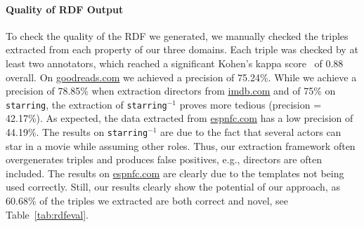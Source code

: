 \paragraph{Quality of RDF Output}
To check the quality of the \ac{RDF} we generated, we manually checked the triples extracted from each property of our three domains.
Each triple was checked by at least two annotators, which reached a significant Kohen's kappa score~\cite{cohen1960coefficient} of 0.88 overall.
On \url{goodreads.com} we achieved a precision of 75.24\%.
While we achieve a precision of 78.85\% when extraction directors from \url{imdb.com} and of 75\% on \texttt{starring}, the extraction of \texttt{starring}$^{-1}$ proves more tedious (precision = 42.17\%).
As expected, the data extracted from \url{espnfc.com} has a low precision of 44.19\%.
The results on \texttt{starring}$^{-1}$ are due to the fact that several actors can star in a movie while assuming other roles. 
Thus, our extraction framework often overgenerates triples and produces false positives, e.g., directors are often included.
The results on \url{espnfc.com} are clearly due to the templates not being used correctly.
Still, our results clearly show the potential of our approach, as 60.68\% of the triples we extracted are both correct and novel, see Table~\ref{tab:rdfeval}.


\begin{table}[htb!]
\centering
{}
\caption{Triples generated by 100 randomly sampled pages, number of possible triples generated by using gold standard rules}
\label{tab:rdfeval}
\end{table}

